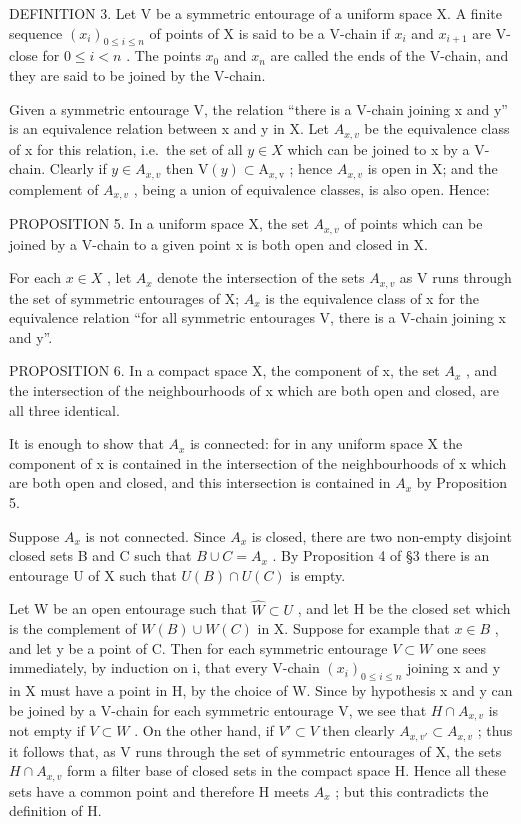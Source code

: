 DEFINITION 3. Let V be a symmetric entourage of a uniform space X. A finite sequence \((x_{i})_{0\leqslant i\leqslant n}\) of points of X is said to be a V-chain if \(x_{i}\) and \(x_{i+1}\) are V-close for \(0\leqslant i<n\) . The points \(x_{0}\) and \(x_{n}\) are called the ends of the V-chain, and they are said to be joined by the V-chain.

Given a symmetric entourage V, the relation ``there is a V-chain joining x and y'' is an equivalence relation between x and y in X. Let \(A_{x,v}\) be the equivalence class of x for this relation, i.e.~the set of all \(y \in X\) which can be joined to x by a V-chain. Clearly if \(y \in A_{x,v}\) then \(\mathrm{V}(y) \subset \mathrm{A}_{x,\mathrm{v}}\) ; hence \(A_{x,v}\) is open in X; and the complement of \(A_{x,v}\) , being a union of equivalence classes, is also open. Hence:

PROPOSITION 5. In a uniform space X, the set \(A_{x,v}\) of points which can be joined by a V-chain to a given point x is both open and closed in X.

For each \(x \in X\) , let \(A_{x}\) denote the intersection of the sets \(A_{x,v}\) as V runs through the set of symmetric entourages of X; \(A_{x}\) is the equivalence class of x for the equivalence relation ``for all symmetric entourages V, there is a V-chain joining x and y''.

PROPOSITION 6. In a compact space X, the component of x, the set \(A_{x}\) , and the intersection of the neighbourhoods of x which are both open and closed, are all three identical.

It is enough to show that \(A_{x}\) is connected: for in any uniform space X the component of x is contained in the intersection of the neighbourhoods of x which are both open and closed, and this intersection is contained in \(A_{x}\) by Proposition 5.

Suppose \(A_{x}\) is not connected. Since \(A_{x}\) is closed, there are two non-empty disjoint closed sets B and C such that \(B \cup C = A_{x}\) . By Proposition 4 of §3 there is an entourage U of X such that \(U(B) \cap U(C)\) is empty.

Let W be an open entourage such that \(\hat{W} \subset U\) , and let H be the closed set which is the complement of \(W(B) \cup W(C)\) in X. Suppose for example that \(x \in B\) , and let y be a point of C. Then for each symmetric entourage \(V \subset W\) one sees immediately, by induction on i, that every V-chain \((x_{i})_{0 \leqslant i \leqslant n}\) joining x and y in X must have a point in H, by the choice of W. Since by hypothesis x and y can be joined by a V-chain for each symmetric entourage V, we see that \(H \cap A_{x,v}\) is not empty if \(V \subset W\) . On the other hand, if \(V' \subset V\) then clearly \(A_{x,v'} \subset A_{x,v}\) ; thus it follows that, as V runs through the set of symmetric entourages of X, the sets \(H \cap A_{x,v}\) form a filter base of closed sets in the compact space H. Hence all these sets have a common point and therefore H meets \(A_{x}\) ; but this contradicts the definition of H.

